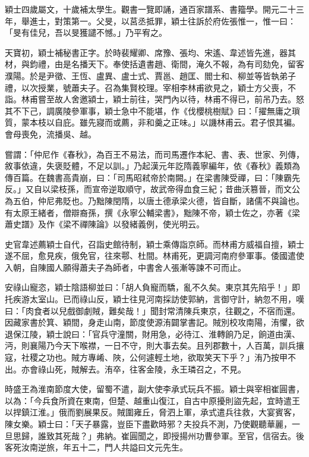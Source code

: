 \begin{pinyinscope}
 穎士四歲屬文，十歲補太學生。觀書一覽即誦，通百家譜系、書籀學。開元二十三年，舉進士，對策第一。父旻，以莒丞抵罪，穎士往訴於府佐張惟一，惟一曰：「旻有佳兒，吾以旻獲譴不憾。」乃平宥之。



 天寶初，穎士補秘書正字。於時裴耀卿、席豫、張均、宋遙、韋述皆先進，器其材，與鈞禮，由是名播天下。奉使括遺書趙、衛間，淹久不報，為有司劾免，留客濮陽。於是尹徵、王恆、盧異、盧士式、賈邕、趙匡、閻士和、柳並等皆執弟子禮，以次授業，號蕭夫子。召為集賢校理。宰相李林甫欲見之，穎士方父喪，不詣。林甫嘗至故人舍邀潁士，穎士前往，哭門內以待，林甫不得已，前吊乃去。怒其不下己，調廣陵參軍事，穎士急中不能堪，作《伐櫻桃樹賦》曰：「擢無庸之瑣質，蒙本枝以自庇。雖先寢而或薦，非和羹之正味。」以譏林甫云。君子恨其褊。會母喪免，流播吳、越。



 嘗謂：「仲尼作《春秋》，為百王不易法，而司馬遷作本紀、書、表、世家、列傳，敘事依違，失褒貶體，不足以訓。」乃起漢元年訖隋義寧編年，依《春秋》義類為傳百篇。在魏書高貴崩，曰：「司馬昭弒帝於南闕。」在梁書陳受禪，曰：「陳霸先反。」又自以梁枝孫，而宣帝逆取順守，故武帝得血食三紀；昔曲沃篡晉，而文公為五伯，仲尼弗貶也。乃黜陳閏隋，以唐土德承梁火德，皆自斷，諸儒不與論也。有太原王緒者，僧辯裔孫，撰《永寧公輔梁書》，黜陳不帝，穎士佐之，亦著《梁蕭史譜》及作《梁不禪陳論》以發緒義例，使光明云。



 史官韋述薦穎士自代，召詣史館待制，穎士乘傳詣京師。而林甫方威福自擅，穎士遂不屈，愈見疾，俄免官，往來鄠、杜間。林甫死，更調河南府參軍事。倭國遣使入朝，自陳國人願得蕭夫子為師者，中書舍人張漸等諫不可而止。



 安祿山寵恣，穎士陰語柳並曰：「胡人負寵而驕，亂不久矣。東京其先陷乎！」即托疾游太室山。已而祿山反，穎士往見河南採訪使郭納，言御守計，納忽不用，嘆曰：「肉食者以兒戲御劇賊，難矣哉！」聞封常清陳兵東京，往觀之，不宿而還。因藏家書於箕、穎間，身走山南，節度使源洧闢掌書記。賊別校攻南陽，洧懼，欲退保江陵，穎士說曰：「官兵守潼關，財用急，必待江、淮轉餉乃足，餉道由漢、沔，則襄陽乃今天下喉襟，一日不守，則大事去矣。且列郡數十，人百萬，訓兵攘寇，社稷之功也。賊方專崤、陜，公何遽輕土地，欲取笑天下乎？」洧乃按甲不出。亦會祿山死，賊解去。洧卒，往客金陵，永王璘召之，不見。



 時盛王為淮南節度大使，留蜀不遣，副大使李承式玩兵不振。穎士與宰相崔圓書，以為：「今兵食所資在東南，但楚、越重山復江，自古中原擾則盜先起，宜時遣王以捍鎮江淮。」俄而劉展果反。賊圍雍丘，脅泗上軍，承式遣兵往救，大宴賓客，陳女樂。穎士曰：「天子暴露，豈臣下盡歡時邪？夫投兵不測，乃使觀聽華麗，一旦思歸，誰致其死哉？」弗納。崔圓聞之，即授揚州功曹參軍。至官，信宿去。後客死汝南逆旅，年五十二，門人共謚曰文元先生。




\end{pinyinscope}
